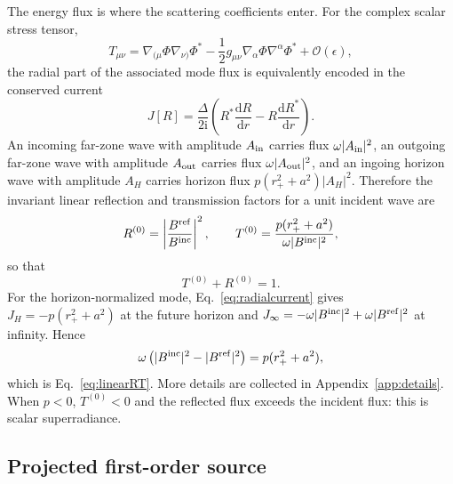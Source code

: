 \documentclass[aps,prd,twocolumn,nofootinbib,superscriptaddress,10pt,floatfix]{revtex4-2}
\newcommand{\ii}{\mathrm{i}}
\newcommand{\dd}{\mathrm{d}}
\newcommand{\calO}{\mathcal{O}}
\newcommand{\rp}{r_+}
\newcommand{\Bin}{B^{\rm inc}}
\newcommand{\Bref}{B^{\rm ref}}
\begin{document}
The energy flux is where the scattering coefficients enter.  For the complex
scalar stress tensor,
\begin{equation}
T_{\mu\nu}
=\nabla_{(\mu}\Phi\nabla_{\nu)}\Phi^*
-\frac{1}{2}g_{\mu\nu}\nabla_\alpha\Phi\nabla^\alpha\Phi^*
+\calO(\epsilon),
\end{equation}
the radial part of the associated mode flux is equivalently encoded in the
conserved current
\begin{equation}
J[R]=\frac{\Delta}{2\ii}
\left(R^*\frac{\dd R}{\dd r}-R\frac{\dd R^*}{\dd r}\right).
\label{eq:radialcurrent}
\end{equation}
An incoming far-zone wave with amplitude $A_{\rm in}$ carries flux
$\omega|A_{\rm in}|^2$, an outgoing far-zone wave with amplitude $A_{\rm out}$
carries flux $\omega|A_{\rm out}|^2$, and an ingoing horizon wave with amplitude
$A_H$ carries horizon flux $p(\rp^2+a^2)|A_H|^2$.  Therefore the invariant
linear reflection and transmission factors for a unit incident wave are
\begin{equation}
R^{(0)}=\left|\frac{\Bref}{\Bin}\right|^2,
\qquad
T^{(0)}=\frac{p(\rp^2+a^2)}{\omega|\Bin|^2},
\label{eq:linearRT}
\end{equation}
so that
\begin{equation}
T^{(0)}+R^{(0)}=1.
\end{equation}
For the horizon-normalized mode, Eq.~\eqref{eq:radialcurrent} gives
$J_H=-p(\rp^2+a^2)$ at the future horizon and
$J_\infty=-\omega|\Bin|^2+\omega|\Bref|^2$ at infinity.  Hence
\begin{equation}
\omega\left(|\Bin|^2-|\Bref|^2\right)=p(\rp^2+a^2),
\label{eq:linearcurrentbalance}
\end{equation}
which is Eq.~\eqref{eq:linearRT}.  More details are collected in
Appendix~\ref{app:details}.
When $p<0$, $T^{(0)}<0$ and the reflected flux exceeds the incident flux:
this is scalar superradiance.

\subsection{Projected first-order source}
\end{document}
